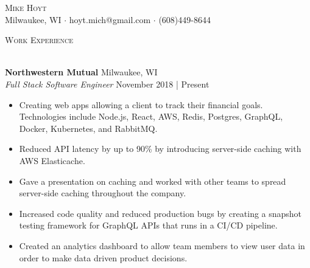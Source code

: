 \documentclass[a4paper]{article}
\newcommand{\lineunder} {
    \vspace*{-8pt} \\
    \hspace*{-18pt} \hrulefill \\
}
\newcommand{\header} [1] {
    {\hspace*{-18pt}\vspace*{6pt} \textsc{#1}}
    \vspace*{-6pt} \lineunder
}
\begin{document}
\vspace*{-40pt}



\vspace*{-10pt}
\begin{center}
	{\Huge \scshape {Mike Hoyt}}\\
	Milwaukee, WI $\cdot$ hoyt.mich@gmail.com $\cdot$ (608)449-8644\\
\end{center}


\header{Work Experience}
\vspace{1mm}

\textbf{Northwestern Mutual} \hfill Milwaukee, WI\\
\textit{Full Stack Software Engineer} \hfill November 2018 | Present\\
\vspace{-1mm}
\begin{itemize} \itemsep 1pt
	\item Creating web apps allowing a client to track their financial goals. Technologies include Node.js, React, AWS, Redis, Postgres, GraphQL, Docker, Kubernetes, and RabbitMQ.
	\item Reduced API latency by up to 90\% by introducing server-side caching with AWS Elasticache.
	\item Gave a presentation on caching and worked with other teams to spread server-side caching throughout the company.
	\item Increased code quality and reduced production bugs by creating a snapshot testing framework for GraphQL APIs that runs in a CI/CD pipeline.
	\item Created an analytics dashboard to allow team members to view user data in order to make data driven product decisions.
\end{itemize}
\vspace{-1mm}
\end{document}

